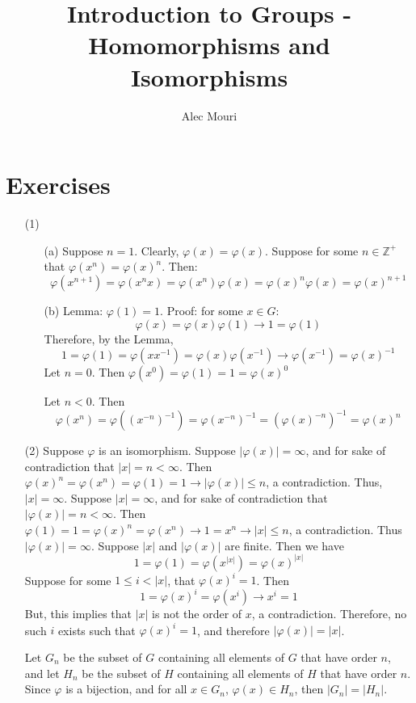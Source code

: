 \documentclass[12pt]{article}
\begin{document}
\title{Introduction to Groups - Homomorphisms and Isomorphisms}
\author{Alec Mouri}

\maketitle
\section*{Exercises}
\begin{itemize}
\item[(1)]
\begin{itemize}
\item[(a)]
Suppose $n = 1$. Clearly, $\varphi(x) = \varphi(x)$. Suppose for some $n \in \mathbb{Z}^+$ that $\varphi(x^n) = \varphi(x)^n$. Then:
$$\varphi(x^{n+1}) = \varphi(x^nx) = \varphi(x^n)\varphi(x) = \varphi(x)^n\varphi(x) = \varphi(x)^{n+1}$$
\item[(b)]
Lemma: $\varphi(1) = 1$. Proof: for some $x \in G$:
$$\varphi(x) = \varphi(x)\varphi(1) \rightarrow 1 = \varphi(1)$$
Therefore, by the Lemma,
$$1 = \varphi(1) = \varphi(xx^{-1}) = \varphi(x)\varphi(x^{-1}) \rightarrow \varphi(x^{-1}) = \varphi(x)^{-1}$$
Let $n = 0$. Then $\varphi(x^0) = \varphi(1) = 1 = \varphi(x)^0$

Let $n < 0$. Then
$$\varphi(x^n) = \varphi((x^{-n})^{-1}) = \varphi(x^{-n})^{-1} = (\varphi(x)^{-n})^{-1} = \varphi(x)^n$$
\end{itemize}
\item[(2)]
Suppose $\varphi$ is an isomorphism. Suppose $|\varphi(x)| = \infty$, and for sake of contradiction that $|x| = n < \infty$. Then $\varphi(x)^n = \varphi(x^n) = \varphi(1) = 1 \rightarrow |\varphi(x)| \leq n$, a contradiction. Thus, $|x| = \infty$. Suppose $|x| = \infty$, and for sake of contradiction that $|\varphi(x)| = n < \infty$. Then $\varphi(1) = 1 = \varphi(x)^n = \varphi(x^n) \rightarrow 1 = x^n \rightarrow |x| \leq n$, a contradiction. Thus $|\varphi(x)| = \infty$. Suppose $|x|$ and $|\varphi(x)|$ are finite. Then we have
$$1 = \varphi(1) = \varphi(x^{|x|}) = \varphi(x)^{|x|}$$
Suppose for some $1 \leq i < |x|$, that $\varphi(x)^i = 1$. Then 
$$1 = \varphi(x)^i = \varphi(x^i) \rightarrow x^i = 1$$
But, this implies that $|x|$ is not the order of $x$, a contradiction. Therefore, no such $i$ exists such that $\varphi(x)^i = 1$, and therefore $|\varphi(x)| = |x|$.

Let $G_n$ be the subset of $G$ containing all elements of $G$ that have order $n$, and let $H_n$ be the subset of $H$ containing all elements of $H$ that have order $n$. Since $\varphi$ is a bijection, and for all $x \in G_n$, $\varphi(x) \in H_n$, then $|G_n| = |H_n|$.


\end{itemize}
\end{document}
